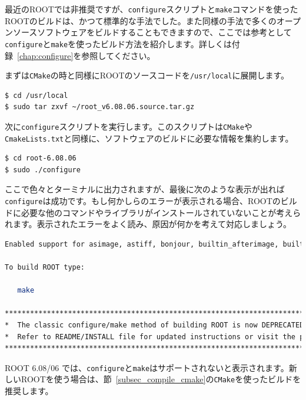 最近のROOTでは非推奨ですが、\texttt{configure}スクリプトと\texttt{make}コマンドを使ったROOTのビルドは、かつて標準的な手法でした。また同様の手法で多くのオープンソースソフトウェアをビルドすることもできますので、ここでは参考として\texttt{configure}と\texttt{make}を使ったビルド方法を紹介します。詳しくは付録~\ref{chap:configure}を参照してください。

まずは\texttt{CMake}の時と同様にROOTのソースコードを\texttt{/usr/local}に展開します。
\begin{lstlisting}[language=bash]
$ cd /usr/local
$ sudo tar zxvf ~/root_v6.08.06.source.tar.gz
\end{lstlisting}

次に\texttt{configure}スクリプトを実行します。このスクリプトは\texttt{CMake}や\texttt{CmakeLists.txt}と同様に、ソフトウェアのビルドに必要な情報を集約します。

\begin{lstlisting}[language=bash]
$ cd root-6.08.06
$ sudo ./configure
\end{lstlisting}

ここで色々とターミナルに出力されますが、最後に次のような表示が出れば\texttt{configure}は成功です。もし何かしらのエラーが表示される場合、ROOTのビルドに必要な他のコマンドやライブラリがインストールされていないことが考えられます。表示されたエラーをよく読み、原因が何かを考えて対応しましょう。
\begin{lstlisting}[language=bash]
Enabled support for asimage, astiff, bonjour, builtin_afterimage, builtin_ftgl, builtin_freetype, builtin_gl2ps, builtin_glew, builtin_unuran, builtin_llvm, libcxx, cocoa, explicitlink, fink, fitsio, gviz, genvector, krb5, ldap, memstat, opengl, python, rpath, search_usrlocal, shared, sqlite, tmva, vdt, xml.

To build ROOT type:

   make 

****************************************************************************************************************
*  The classic configure/make method of building ROOT is now DEPRECATED in favor of the CMake one.             *
*  Refer to README/INSTALL file for updated instructions or visit the page https://root.cern.ch/building-root  *
****************************************************************************************************************
\end{lstlisting}
ROOT 6.08/06 では、\texttt{configure}と\texttt{make}はサポートされないと表示されます。新しいROOTを使う場合は、節~\ref{subsec_compile_cmake}の\texttt{CMake}を使ったビルドを推奨します。


